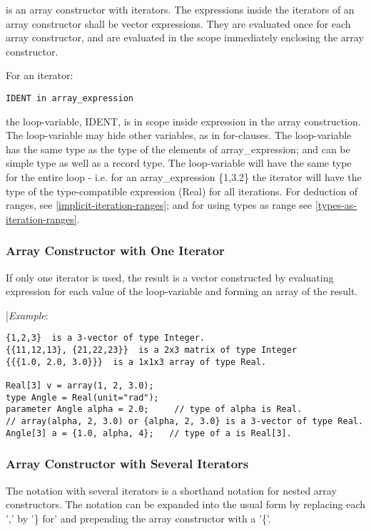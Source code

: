 is an array constructor with iterators. The expressions inside the
iterators of an array constructor shall be vector expressions. They are
evaluated once for each array constructor, and are evaluated in the
scope immediately enclosing the array constructor.

For an iterator:
\begin{lstlisting}[language=modelica]
IDENT in array_expression
\end{lstlisting}

the loop-variable, IDENT, is in scope inside expression in the array
construction. The loop-variable may hide other variables, as in
for-clauses. The loop-variable has the same type as the type of the
elements of array\_expression; and can be simple type as well as a
record type. The loop-variable will have the same type for the entire
loop - i.e. for an array\_expression \{1,3.2\} the iterator will have
the type of the type-compatible expression (Real) for all iterations.
For deduction of ranges, see \ref{implicit-iteration-ranges}; and for using types as
range see \ref{types-as-iteration-ranges}.

\subsubsection{Array Constructor with One Iterator}

If only one iterator is used, the result is a vector constructed by
evaluating expression for each value of the loop-variable and forming an
array of the result.

{[}\emph{Example}:
\begin{lstlisting}[language=modelica]
{1,2,3}  is a 3-vector of type Integer. 
{{11,12,13}, {21,22,23}}  is a 2x3 matrix of type Integer 
{{{1.0, 2.0, 3.0}}}  is a 1x1x3 array of type Real. 

Real[3] v = array(1, 2, 3.0); 
type Angle = Real(unit="rad");     
parameter Angle alpha = 2.0;     // type of alpha is Real. 
// array(alpha, 2, 3.0) or {alpha, 2, 3.0} is a 3-vector of type Real. 
Angle[3] a = {1.0, alpha, 4};   // type of a is Real[3].
\end{lstlisting}
\subsubsection{Array Constructor with Several Iterators}

The notation with several iterators is a shorthand notation for nested
array constructors. The notation can be expanded into the usual form by
replacing each ',' by '\} for' and prepending the array constructor with
a '\{'.

